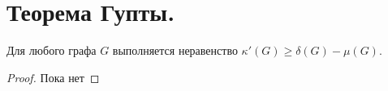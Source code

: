 \section{Теорема Гупты.}
\begin{theorem}[Гупта, 1974]
    Для любого графа $G$ выполняется неравенство $\kappa'(G) \ge  \delta(G) - \mu(G)$.
\end{theorem}
\begin{proof}
    Пока нет
\end{proof}
